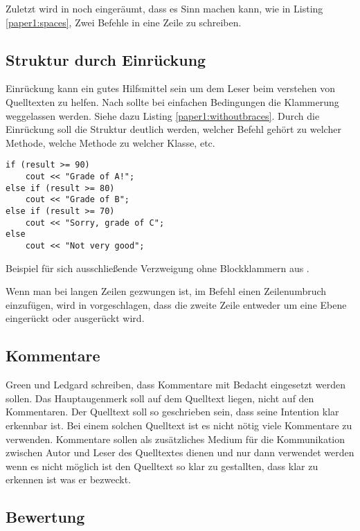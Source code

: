 Zuletzt wird in \cite{Green} noch eingeräumt, dass es Sinn machen kann, wie in Listing \ref{paper1:spaces}, Zwei Befehle in eine Zeile zu schreiben.

\subsection{Struktur durch Einrückung}
Einrückung kann ein gutes Hilfsmittel sein um dem Leser beim verstehen von Quelltexten zu helfen. Nach \cite[S. 8]{Green} sollte bei einfachen Bedingungen die Klammerung weggelassen werden. Siehe dazu Listing \ref{paper1:withoutbraces}. Durch die Einrückung soll die Struktur deutlich werden, welcher Befehl gehört zu welcher Methode, welche Methode zu welcher Klasse, etc.

\begin{listing}[H]
    \begin{verbatim}
if (result >= 90)
    cout << "Grade of A!";
else if (result >= 80)
    cout << "Grade of B";
else if (result >= 70)
    cout << "Sorry, grade of C";
else
    cout << "Not very good";
    \end{verbatim}
    \label{paper1:withoutbraces}
    \caption{Beispiel für sich ausschließende Verzweigung ohne Blockklammern aus \cite[S. 8]{Green}.}
\end{listing}

Wenn man bei langen Zeilen gezwungen ist, im Befehl einen Zeilenumbruch einzufügen, wird in \cite[S. 3]{Green} vorgeschlagen, dass die zweite Zeile entweder um eine Ebene eingerückt oder ausgerückt wird.

\subsection{Kommentare}
Green und Ledgard schreiben, dass Kommentare mit Bedacht eingesetzt werden sollen. Das Hauptaugenmerk soll auf dem Quelltext liegen, nicht auf den Kommentaren. Der Quelltext soll so geschrieben sein, dass seine Intention klar erkennbar ist. Bei einem solchen Quelltext ist es nicht nötig viele Kommentare zu verwenden. Kommentare sollen als zusätzliches Medium für die Kommunikation zwischen Autor und Leser des Quelltextes dienen und nur dann verwendet werden wenn es nicht möglich ist den Quelltext so klar zu gestallten, dass klar zu erkennen ist was er bezweckt. \cite[S. 9]{Green}


\subsection{Bewertung}

